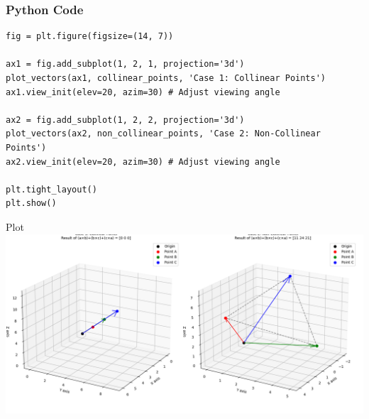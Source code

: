 \documentclass{beamer}
\begin{document}
\begin{frame}[fragile]
    \frametitle{Python Code}
    \begin{lstlisting}
fig = plt.figure(figsize=(14, 7))

ax1 = fig.add_subplot(1, 2, 1, projection='3d')
plot_vectors(ax1, collinear_points, 'Case 1: Collinear Points')
ax1.view_init(elev=20, azim=30) # Adjust viewing angle

ax2 = fig.add_subplot(1, 2, 2, projection='3d')
plot_vectors(ax2, non_collinear_points, 'Case 2: Non-Collinear Points')
ax2.view_init(elev=20, azim=30) # Adjust viewing angle

plt.tight_layout()
plt.show()
    \end{lstlisting}
\end{frame}

\begin{frame}{Plot}
    \centering
    \includegraphics[width=\columnwidth, height=0.8\textheight, keepaspectratio]{figs/fig1.png}     
\end{frame}
\end{document}
